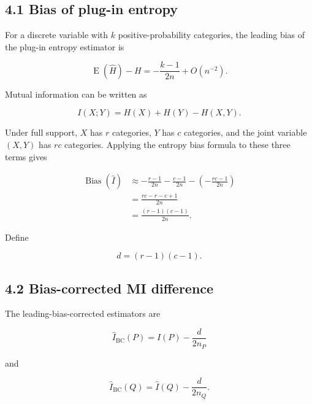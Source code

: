 \documentclass[
  11pt]{article}
\begin{document}
\subsection{4.1 Bias of plug-in entropy}\label{bias-of-plug-in-entropy}

For a discrete variable with \(k\) positive-probability categories, the
leading bias of the plug-in entropy estimator is

\begin{equation}
\operatorname E(\widehat H)-H
=-\frac{k-1}{2n}+O(n^{-2}).
\end{equation}

Mutual information can be written as

\begin{equation}
I(X;Y)=H(X)+H(Y)-H(X,Y).
\end{equation}

Under full support, \(X\) has \(r\) categories, \(Y\) has \(c\)
categories, and the joint variable \((X,Y)\) has \(rc\) categories.
Applying the entropy bias formula to these three terms gives

\begin{equation}
\begin{aligned}
\operatorname{Bias}(\widehat I)
&\approx
-\frac{r-1}{2n}
-\frac{c-1}{2n}
-\left(-\frac{rc-1}{2n}\right)\\
&=\frac{rc-r-c+1}{2n}\\
&=\frac{(r-1)(c-1)}{2n}.
\end{aligned}
\end{equation}

Define

\begin{equation}
d=(r-1)(c-1).
\end{equation}

\subsection{4.2 Bias-corrected MI
difference}\label{bias-corrected-mi-difference}

The leading-bias-corrected estimators are

\begin{equation}
\widehat I_{\mathrm{BC}}(P)
=\widehat I(P)-\frac{d}{2n_P}
\end{equation}

and

\begin{equation}
\widehat I_{\mathrm{BC}}(Q)
=\widehat I(Q)-\frac{d}{2n_Q}.
\end{equation}
\end{document}

